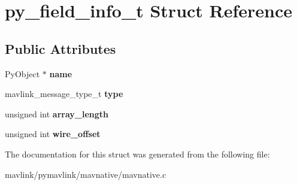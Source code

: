 \hypertarget{structpy__field__info__t}{}\section{py\+\_\+field\+\_\+info\+\_\+t Struct Reference}
\label{structpy__field__info__t}
\subsection*{Public Attributes}
\begin{DoxyCompactItemize}
\item 
\mbox{\label{structpy__field__info__t_a2608498cd76834f44e809bdbab8a15ae}} 
Py\+Object $\ast$ {\bfseries name}
\item 
\mbox{\label{structpy__field__info__t_a2b210dc8b7cf956da25e5ca9566ab592}} 
mavlink\+\_\+message\+\_\+type\+\_\+t {\bfseries type}
\item 
\mbox{\label{structpy__field__info__t_af8648cb704f468d769ff9884117e8770}} 
unsigned int {\bfseries array\+\_\+length}
\item 
\mbox{\label{structpy__field__info__t_a93feb91fe24f3c37a6154f1af3c58f56}} 
unsigned int {\bfseries wire\+\_\+offset}
\end{DoxyCompactItemize}


The documentation for this struct was generated from the following file\+:\begin{DoxyCompactItemize}
\item 
mavlink/pymavlink/mavnative/mavnative.\+c\end{DoxyCompactItemize}
